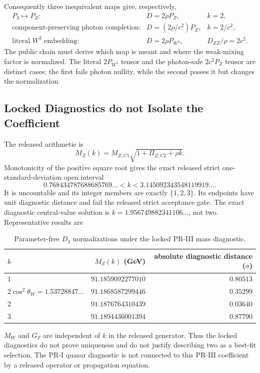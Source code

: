 Consequently three inequivalent maps give, respectively,
\begin{equation}
 \begin{array}{lll}
 P_3\mapsto P_Z:&D=2\rho P_Z,&k=2,\\
 \text{component-preserving photon completion}:&
 D=(2\rho/c^2)P_Z,&k=2/c^2,\\
 \text{literal }W^3\text{ embedding}:&D=2\rho P_{W^3},&
 D_{ZZ}/\rho=2c^2.
 \end{array}
 \label{eq:pr35-d3-three-neutral-maps}
\end{equation}
The public chain must derive which map is meant and where the weak-mixing
factor is normalized.  The literal $2P_{W^3}$ tensor and the photon-safe
$2c^2P_Z$ tensor are distinct cases: the first fails photon nullity, while the
second passes it but changes the normalization.

\subsection{Locked Diagnostics do not Isolate the Coefficient}

The released arithmetic is
\begin{equation}
 M_Z(k)=M_{Z,C1}\sqrt{1+\Pi_{Z,C2}+\rho k}.
 \label{eq:pr35-d3-mz-k}
\end{equation}
Monotonicity of the positive square root gives the exact released strict
one-standard-deviation open interval
\begin{equation}
 0.768434787688685769\ldots< k <
 3.145092343548119919\ldots .
 \label{eq:pr35-d3-diagnostic-interval}
\end{equation}
It is uncountable and its integer members are exactly $\{1,2,3\}$.  Its
endpoints have unit diagnostic distance and fail the released strict
acceptance gate.  The exact
diagnostic central-value solution is
$k=1.956749882341106\ldots$, not two.  Representative results are
\begin{table}[H]
\centering
\caption{Parameter-free $D_3$ normalizations under the locked PR-III mass diagnostic.}
\label{tab:pr35-d3-countermodel-diagnostics}
\begin{tabular}{@{}lrr@{}}
\toprule
$k$ & $M_Z(k)$ (GeV) & absolute diagnostic distance ($\sigma$)\\
\midrule
$1$ & $91.1859092277010$ & $0.80513$\\
$2\cos^2\theta_W=1.53728847\ldots$ & $91.1868587299446$ & $0.35299$\\
$2$ & $91.1876764310439$ & $0.03640$\\
$3$ & $91.1894436001394$ & $0.87790$\\
\bottomrule
\end{tabular}
\end{table}
$M_W$ and $G_F$ are independent of $k$ in the released generator.  Thus the
locked diagnostics do not prove uniqueness and do not justify describing two
as a best-fit selection.  The PR-I quasar diagnostic is not connected to this
PR-III coefficient by a released operator or propagation equation.

